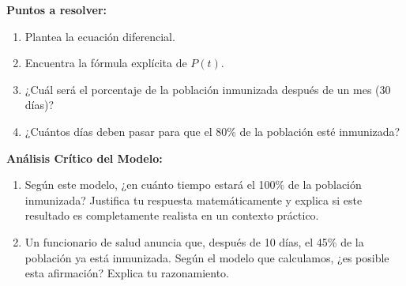 \documentclass[12pt,a4paper]{article}
\begin{document}
\textbf{Puntos a resolver:}
\begin{enumerate}[label=\textbf{\Alph*.},leftmargin=2em]
    \item Plantea la ecuación diferencial.
    \item Encuentra la fórmula explícita de $P(t)$.
    \item ¿Cuál será el porcentaje de la población inmunizada después de un mes (30 días)?
    \item ¿Cuántos días deben pasar para que el 80\% de la población esté inmunizada?
\end{enumerate}

\textbf{Análisis Crítico del Modelo:}
\begin{enumerate}[label=\textbf{E\arabic*.},leftmargin=2em]
    \item Según este modelo, ¿en cuánto tiempo estará el 100\% de la población inmunizada? Justifica tu respuesta matemáticamente y explica si este resultado es completamente realista en un contexto práctico.
    \item Un funcionario de salud anuncia que, después de 10 días, el 45\% de la población ya está inmunizada. Según el modelo que calculamos, ¿es posible esta afirmación? Explica tu razonamiento.
\end{enumerate}
\end{document}
